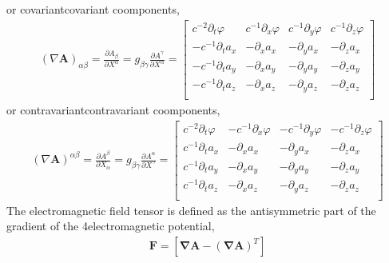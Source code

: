 \documentclass[letterpaper,10pt,english]{jupyterBook}
\begin{document}
\sphinxAtStartPar
or covariant\sphinxhyphen{}covariant coomponents,
\begin{equation*}
\begin{split}(\nabla \mathbf{A})_{\alpha \beta} = \frac{\partial A_{\beta}}{\partial X^{\alpha}} = g_{\beta \gamma} \frac{\partial A^{\gamma}}{\partial X^{\alpha}} = 
\begin{bmatrix}
  c^{-2}\partial_t \varphi & c^{-1}\partial_x \varphi & c^{-1}\partial_y \varphi & c^{-1}\partial_z \varphi \\
 -c^{-1}\partial_t a_x     &      -\partial_x a_x     &      -\partial_y a_x     &      -\partial_z a_x     \\
 -c^{-1}\partial_t a_y     &      -\partial_x a_y     &      -\partial_y a_y     &      -\partial_z a_y     \\
 -c^{-1}\partial_t a_z     &      -\partial_x a_z     &      -\partial_y a_z     &      -\partial_z a_z     \\
\end{bmatrix}\end{split}
\end{equation*}
\sphinxAtStartPar
or contravariant\sphinxhyphen{}contravariant coomponents,
\begin{equation*}
\begin{split}(\nabla \mathbf{A})^{\alpha \beta} = \frac{\partial A^{\beta}}{\partial X_{\alpha}} = g_{\beta \gamma} \frac{\partial A^{\alpha}}{\partial X^{\gamma}} = 
\begin{bmatrix}
  c^{-2}\partial_t \varphi &-c^{-1}\partial_x \varphi &-c^{-1}\partial_y \varphi &-c^{-1}\partial_z \varphi \\
  c^{-1}\partial_t a_x     &      -\partial_x a_x     &      -\partial_y a_x     &      -\partial_z a_x     \\
  c^{-1}\partial_t a_y     &      -\partial_x a_y     &      -\partial_y a_y     &      -\partial_z a_y     \\
  c^{-1}\partial_t a_z     &      -\partial_x a_z     &      -\partial_y a_z     &      -\partial_z a_z     \\
\end{bmatrix}\end{split}
\end{equation*}
\sphinxAtStartPar
The electromagnetic field tensor is defined as the anti\sphinxhyphen{}symmetric part of the gradient of the 4\sphinxhyphen{}electromagnetic potential,
\begin{equation*}
\begin{split}\mathbf{F} = \left[ \symbf{\nabla} \mathbf{A} - \left( \symbf{\nabla} \mathbf{A} \right)^T \right]\end{split}
\end{equation*}
\end{document}
